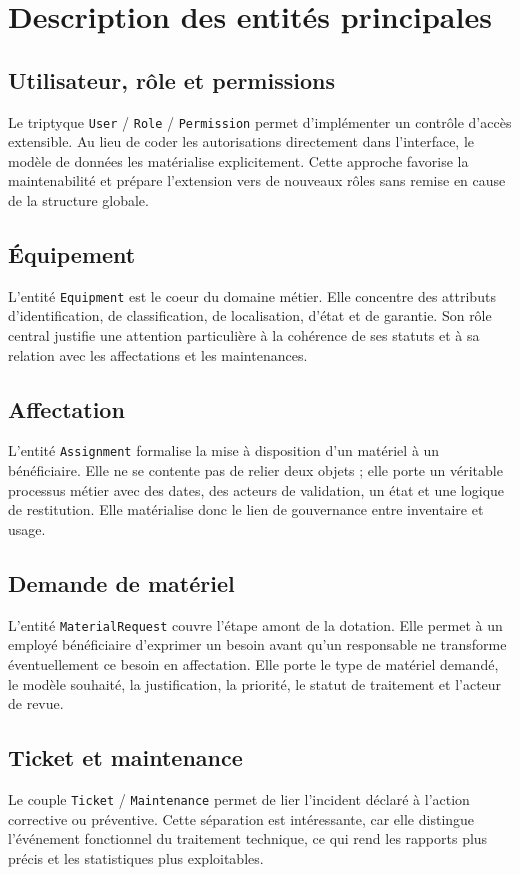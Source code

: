 \section{Description des entités principales}
\subsection{Utilisateur, rôle et permissions}
Le triptyque \texttt{User} / \texttt{Role} / \texttt{Permission} permet d'implémenter un contrôle d'accès extensible. Au lieu de coder les autorisations directement dans l'interface, le modèle de données les matérialise explicitement. Cette approche favorise la maintenabilité et prépare l'extension vers de nouveaux rôles sans remise en cause de la structure globale.

\subsection{Équipement}
L'entité \texttt{Equipment} est le coeur du domaine métier. Elle concentre des attributs d'identification, de classification, de localisation, d'état et de garantie. Son rôle central justifie une attention particulière à la cohérence de ses statuts et à sa relation avec les affectations et les maintenances.

\subsection{Affectation}
L'entité \texttt{Assignment} formalise la mise à disposition d'un matériel à un bénéficiaire. Elle ne se contente pas de relier deux objets ; elle porte un véritable processus métier avec des dates, des acteurs de validation, un état et une logique de restitution. Elle matérialise donc le lien de gouvernance entre inventaire et usage.

\subsection{Demande de matériel}
L'entité \texttt{MaterialRequest} couvre l'étape amont de la dotation. Elle permet à un employé bénéficiaire d'exprimer un besoin avant qu'un responsable ne transforme éventuellement ce besoin en affectation. Elle porte le type de matériel demandé, le modèle souhaité, la justification, la priorité, le statut de traitement et l'acteur de revue.

\subsection{Ticket et maintenance}
Le couple \texttt{Ticket} / \texttt{Maintenance} permet de lier l'incident déclaré à l'action corrective ou préventive. Cette séparation est intéressante, car elle distingue l'événement fonctionnel du traitement technique, ce qui rend les rapports plus précis et les statistiques plus exploitables.

